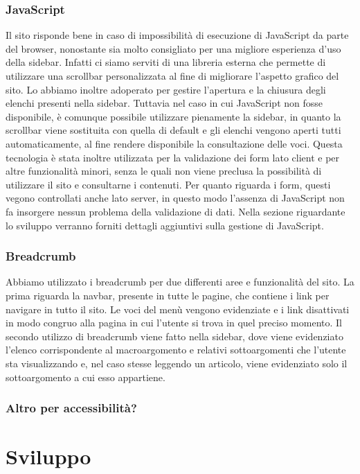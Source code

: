 \documentclass[12pt]{article}
\begin{document}
	\subsubsection{JavaScript}
	Il sito risponde bene in caso di impossibilità di esecuzione di JavaScript da parte del browser, nonostante sia molto consigliato per una migliore esperienza d'uso della sidebar. Infatti ci siamo serviti di una libreria esterna che permette di utilizzare una scrollbar personalizzata al fine di migliorare l'aspetto grafico del sito. Lo abbiamo inoltre adoperato per gestire l'apertura e la chiusura degli elenchi presenti nella sidebar. Tuttavia nel caso in cui JavaScript non fosse disponibile, è comunque possibile utilizzare pienamente la sidebar, in quanto la scrollbar viene sostituita con quella di default e gli elenchi vengono aperti tutti automaticamente, al fine rendere disponibile la consultazione delle voci.
	Questa tecnologia è stata inoltre utilizzata per la validazione dei form lato client e per altre funzionalità minori, senza le quali non viene preclusa la possibilità di utilizzare il sito e consultarne i contenuti. Per quanto riguarda i form, questi vegono controllati anche lato server, in questo modo l'assenza di JavaScript non fa insorgere nessun problema della validazione di dati.	Nella sezione  riguardante lo sviluppo verranno forniti dettagli aggiuntivi sulla gestione di JavaScript.
	\subsubsection{Breadcrumb}
	Abbiamo utilizzato i breadcrumb per due differenti aree e funzionalità del sito. La prima riguarda la navbar, presente in tutte le pagine, che contiene i link per navigare in tutto il sito. Le voci del menù vengono evidenziate e i link disattivati in modo congruo alla pagina in cui l'utente si trova in quel preciso momento. Il secondo utilizzo di breadcrumb viene fatto nella sidebar, dove viene evidenziato l'elenco corrispondente al macroargomento e relativi sottoargomenti che l'utente sta visualizzando e, nel caso stesse leggendo un articolo, viene evidenziato solo il sottoargomento a cui esso appartiene.
	
	\subsubsection{Altro per accessibilità?}
	

	\section{Sviluppo}
\end{document}
